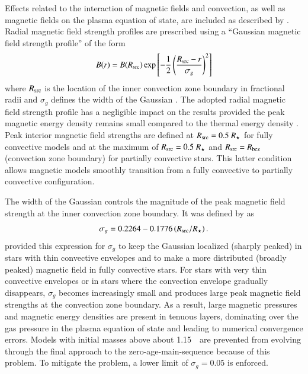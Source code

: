\documentclass{aa}
\begin{document}
Effects related to the interaction of magnetic fields and convection, as well as magnetic fields on the plasma equation of state, are included as described by \citet{FC12b,FC13}. Radial magnetic field strength profiles are prescribed using a ``Gaussian magnetic field strength profile'' of the form
\begin{equation}
	B(r) = B(R_{\rm src}) \exp\left[-\frac{1}{2}\left(\frac{R_{\rm src} - r}{\sigma_g}\right)^2\right]
\end{equation}
where $R_{\rm src}$ is the location of the inner convection zone boundary in fractional radii and $\sigma_g$ defines the width of the Gaussian \citep{FC13}. The adopted radial magnetic field strength profile has a negligible impact on the results provided the peak magnetic energy density remains small compared to the thermal energy density \citep{FC13,FC14,FC14b}.
Peak interior magnetic field strengths are defined at $R_{\rm src} = 0.5\ R_{\star}$ for fully convective models and at the maximum of $R_{\rm src} = 0.5\ R_{\star}$ and $R_{\rm src} = R_{\rm bcz}$ (convection zone boundary) for partially convective stars. This latter condition allows magnetic models smoothly transition from a fully convective to partially convective configuration. 

The width of the Gaussian controls the magnitude of the peak magnetic field strength at the inner convection zone boundary. It was defined by \citet{FC13} as
\begin{equation}
	\sigma_g = 0.2264 - 0.1776 \left(R_{\rm src}/R_{\star}\right).
\end{equation}
\citet{FC13} provided this expression for $\sigma_g$ to keep the Gaussian localized (sharply peaked) in stars with thin convective envelopes and to make a more distributed (broadly peaked) magnetic field in fully convective stars. For stars with very thin convective envelopes or in stars where the convection envelope gradually disappears, $\sigma_g$ becomes increasingly small and produces large peak magnetic field strengths at the convection zone boundary. As a result, large magnetic pressures and magnetic energy densities are present in tenuous layers, dominating over the gas pressure in the plasma equation of state and leading to numerical convergence errors. Models with initial masses above about 1.15~\msun\ are prevented from evolving through the final approach to the zero-age-main-sequence because of this problem. To mitigate the problem, a lower limit of $\sigma_g = 0.05$ is enforced.
\end{document}
